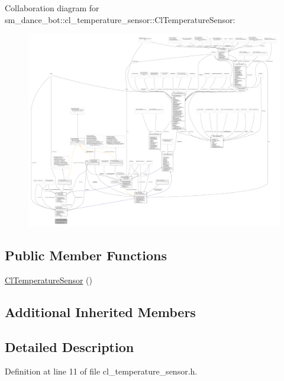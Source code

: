 Collaboration diagram for sm\+\_\+dance\+\_\+bot\+:\+:cl\+\_\+temperature\+\_\+sensor\+:\+:Cl\+Temperature\+Sensor\+:
\nopagebreak
\begin{figure}[H]
\begin{center}
\leavevmode
\includegraphics[width=350pt]{classsm__dance__bot_1_1cl__temperature__sensor_1_1ClTemperatureSensor__coll__graph}
\end{center}
\end{figure}
\subsection*{Public Member Functions}
\begin{DoxyCompactItemize}
\item 
\hyperlink{classsm__dance__bot_1_1cl__temperature__sensor_1_1ClTemperatureSensor_ac2e5d27f5110bc19393890214429d0bf}{Cl\+Temperature\+Sensor} ()
\end{DoxyCompactItemize}
\subsection*{Additional Inherited Members}


\subsection{Detailed Description}


Definition at line 11 of file cl\+\_\+temperature\+\_\+sensor.\+h.



